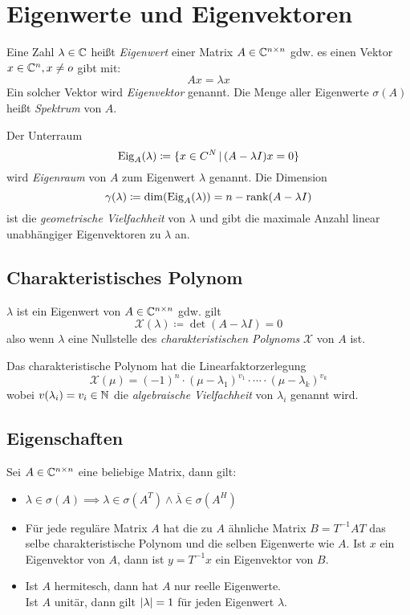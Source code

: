     \section{Eigenwerte und Eigenvektoren}
        Eine Zahl \( \lambda \in \mathbb{C} \) heißt \textit{Eigenwert} einer Matrix \( A \in \mathbb{C}^{n \times n} \) gdw. es einen Vektor \( x \in \mathbb{C}^n, x \neq o \) gibt mit:
        \begin{equation*}
	        Ax = \lambda x
        \end{equation*}
        Ein solcher Vektor wird \textit{Eigenvektor} genannt. Die Menge aller Eigenwerte \( \sigma(A) \) heißt \textit{Spektrum} von \(A\).
        
        Der Unterraum \[ \operatorname{Eig}_A(\lambda) \coloneqq \{ x \in C^N \,\vert\, (A - \lambda I)x = 0 \} \] wird \textit{Eigenraum} von \(A\) zum Eigenwert \(\lambda\) genannt. Die Dimension \[ \gamma(\lambda) \coloneqq \dim(\operatorname{Eig}_A(\lambda)) = n - \rank(A - \lambda I) \] ist die \textit{geometrische Vielfachheit} von \(\lambda\) und gibt die maximale Anzahl linear unabhängiger Eigenvektoren zu \(\lambda\) an.

        \subsection{Charakteristisches Polynom}
            \( \lambda \) ist ein Eigenwert von \(A \in \mathbb{C}^{n \times n} \) gdw. gilt \[ \mathcal{X}(\lambda) \coloneqq \det (A - \lambda I) = 0 \] also wenn \(\lambda\) eine Nullstelle des \textit{charakteristischen Polynoms} \(\mathcal{X}\) von \(A\) ist.
            
            Das charakteristische Polynom hat die Linearfaktorzerlegung \[ \mathcal{X}(\mu) = (-1)^n \cdot (\mu - \lambda_1)^{v_1} \cdot \cdots \cdot (\mu - \lambda_k)^{v_k} \] wobei \( v(\lambda_i) = v_i \in \mathbb{N} \) die \textit{algebraische Vielfachheit} von \(\lambda_i\) genannt wird.

        \subsection{Eigenschaften}
            Sei \( A \in \mathbb{C}^{n \times n} \) eine beliebige Matrix, dann gilt:
            \begin{itemize}
            	\item \( \lambda \in \sigma(A) \implies \lambda \in \sigma(A^T) \land \overline{\lambda} \in \sigma(A^H) \)
            	\item Für jede reguläre Matrix \(A\) hat die zu \(A\) ähnliche Matrix \( B = T^{-1} A T \) das selbe charakteristische Polynom und die selben Eigenwerte wie \(A\). Ist \(x\) ein Eigenvektor von \(A\), dann ist \( y = T^{-1} x \) ein Eigenvektor von \(B\).
            	\item Ist \(A\) hermitesch, dann hat \(A\) nur reelle Eigenwerte. \\ Ist \(A\) unitär, dann gilt \( \abs{\lambda} = 1 \) für jeden Eigenwert \(\lambda\).
            \end{itemize}


